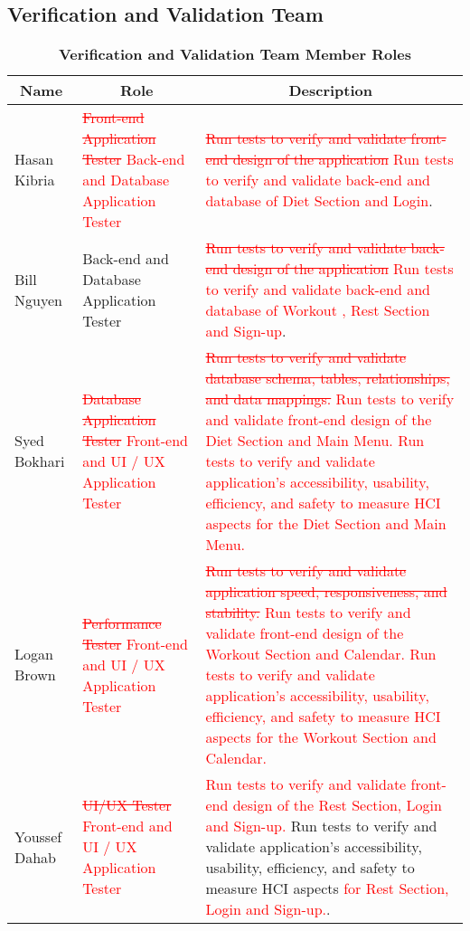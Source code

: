 \documentclass[12pt, titlepage]{article}
\begin{document}
\subsection{Verification and Validation Team}

\begin{table}[H]
	\centering
	\caption{\textbf{Verification and Validation Team Member Roles}}
	\begin{tabular}{|p{3cm}|p{4cm}|p{7cm}|}
		\hline
		\multicolumn{1}{|c|}{\textbf{Name}} & \multicolumn{1}{|c|}{\textbf{Role}} & \multicolumn{1}{|c|}{\textbf{Description}}
		\\ \hline
		Hasan Kibria & \textcolor{red}{\sout{Front-end Application Tester}} \textcolor{red}{Back-end and Database Application Tester} & \textcolor{red}{\sout{Run tests to verify and validate front-end design of the application}} \textcolor{red}{Run tests to verify and validate back-end and database of Diet Section and Login}.
		\\ \hline
		Bill Nguyen & Back-end and Database Application Tester & \textcolor{red}{\sout{Run tests to verify and validate back-end design of the application}} \textcolor{red}{Run tests to verify and validate back-end and database of Workout , Rest Section and Sign-up}.
		\\ \hline
		Syed Bokhari & \textcolor{red}{\sout{Database Application Tester}} \textcolor{red}{Front-end and UI / UX Application Tester} & \textcolor{red}{\sout{Run tests to verify and validate database schema, tables, relationships, and data mappings.}} \textcolor{red}{Run tests to verify and validate front-end design of the Diet Section and Main Menu. Run tests to verify and validate application's accessibility, usability, efficiency, and safety to measure HCI aspects for the Diet Section and Main Menu.}
		\\ \hline
		Logan Brown & \textcolor{red}{\sout{Performance Tester}} \textcolor{red}{Front-end and UI / UX Application Tester} & \textcolor{red}{\sout{Run tests to verify and validate application speed, responsiveness, and stability.}} \textcolor{red}{Run tests to verify and validate front-end design of the Workout Section and Calendar. Run tests to verify and validate application's accessibility, usability, efficiency, and safety to measure HCI aspects for the Workout Section and Calendar.}
		\\ \hline
		Youssef Dahab &  \textcolor{red}{\sout{UI/UX Tester}}  \textcolor{red}{Front-end and UI / UX Application Tester} & \textcolor{red}{Run tests to verify and validate front-end design of the Rest Section, Login and Sign-up.} Run tests to verify and validate application's accessibility, usability, efficiency, and safety to measure HCI aspects \textcolor{red}{for Rest Section, Login and Sign-up.}.

\end{tabular}
\end{table}
\end{document}
